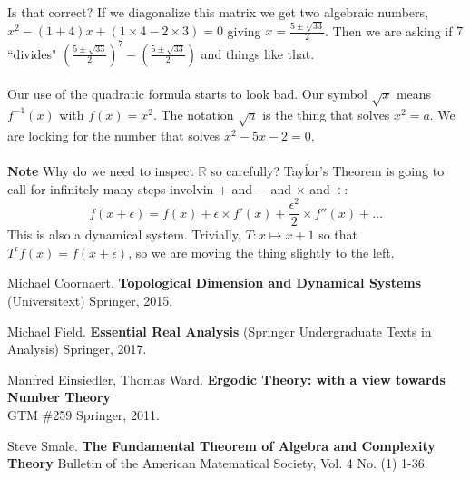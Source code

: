 \documentclass[12pt]{article}
\begin{document}
Is that correct?  If we diagonalize this matrix we get two algebraic numbers, $x^2 - (1+4)x + (1 \times 4 - 2 \times 3) = 0 $ giving $x = \frac{5 \pm \sqrt{33}}{2}$.  Then we are asking if $7$ ``divides"  $(\frac{5 \pm \sqrt{33}}{2})^7 - (\frac{5 \pm \sqrt{33}}{2})$ and things like that.\\ \\
Our use of the quadratic formula starts to look bad.  Our symbol $\sqrt{x}$ means $f^{-1}(x)$ with $f(x) = x^2$.  The notation $\sqrt{a}$ is the thing that solves $x^2 = a$.  We are looking for the number that solves $x^2 - 5x - 2 = 0$.  
  \\ \\
\textbf{Note} Why do we need to inspect $\mathbb{R}$ so carefully?  Tayĺor's Theorem is going to call for infinitely many steps involvin $+$ and $-$ and $\times$ and $\div$:
$$ f(x + \epsilon) = f(x) + \epsilon \times f'(x) + \frac{\epsilon^2}{2} \times f''(x) + \dots  $$
This is also a dynamical system.  Trivially, $T : x \mapsto x + 1$ so that $T^\epsilon f(x) = f(x+\epsilon)$, so we are moving the thing slightly to the left.
\vfill 

\begin{thebibliography}{}

\item Michael Coornaert. \textbf{Topological Dimension and Dynamical Systems} (Universitext) Springer, 2015.

\item Michael Field. \textbf{Essential Real Analysis} (Springer Undergraduate Texts in Analysis) Springer, 2017.


\item Manfred Einsiedler, Thomas Ward. \textbf{Ergodic Theory: with a view towards Number Theory} \\GTM \#259 Springer, 2011.

\item Steve Smale. \textbf{The Fundamental Theorem of Algebra and Complexity Theory} Bulletin of the American Matematical Society, Vol. 4 No. (1) 1-36.


\end{thebibliography}
\end{document}
